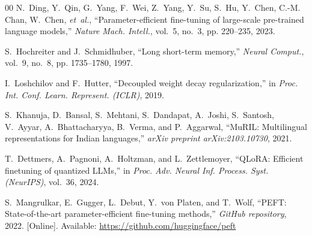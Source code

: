 \documentclass[conference]{IEEEtran}
\begin{document}
\begin{thebibliography}{00}
N.~Ding, Y.~Qin, G.~Yang, F.~Wei, Z.~Yang, Y.~Su, S.~Hu, Y.~Chen, C.-M. Chan, W.~Chen, \emph{et~al.}, ``Parameter-efficient fine-tuning of large-scale pre-trained language models,'' \emph{Nature Mach. Intell.}, vol.~5, no.~3, pp. 220--235, 2023.

S.~Hochreiter and J.~Schmidhuber, ``Long short-term memory,'' \emph{Neural Comput.}, vol.~9, no.~8, pp. 1735--1780, 1997.

I.~Loshchilov and F.~Hutter, ``Decoupled weight decay regularization,'' in \emph{Proc. Int. Conf. Learn. Represent. (ICLR)}, 2019.

S.~Khanuja, D.~Bansal, S.~Mehtani, S.~Dandapat, A.~Joshi, S.~Santosh, V.~Ayyar, A.~Bhattacharyya, B.~Verma, and P.~Aggarwal, ``MuRIL: Multilingual representations for Indian languages,'' \emph{arXiv preprint arXiv:2103.10730}, 2021.

T.~Dettmers, A.~Pagnoni, A.~Holtzman, and L.~Zettlemoyer, ``QLoRA: Efficient finetuning of quantized LLMs,'' in \emph{Proc. Adv. Neural Inf. Process. Syst. (NeurIPS)}, vol.~36, 2024.

S.~Mangrulkar, E.~Gugger, L.~Debut, Y.~von Platen, and T.~Wolf, ``PEFT: State-of-the-art parameter-efficient fine-tuning methods,'' \emph{GitHub repository}, 2022. [Online]. Available: \url{https://github.com/huggingface/peft}

\end{thebibliography}
\end{document}
